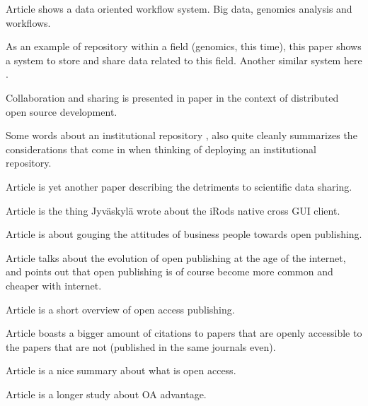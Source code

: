 Article \cite{DBLP:conf/bcb/PiredduLSZ14} shows a data oriented workflow
system. Big data, genomics analysis and workflows.

As an example of repository within a field (genomics, this time), this paper
\cite{craigon2004nascarrays} shows a system to store and share data related
to this field. Another similar system here \cite{DBLP:journals/nar/EdgarDL03}.

Collaboration and sharing is presented in paper \cite{craigon2004nascarrays} in
the context of distributed open source development.

Some words about an institutional repository \cite{gibbons2009benefits}, also
quite cleanly summarizes the considerations that come in when thinking of
deploying an institutional repository.

Article \cite{DBLP:conf/icegov/SayogoP11} is yet another paper describing
the detriments to scientific data sharing.

Article \cite{irodsinproceedings} is the thing Jyväskylä wrote about the iRods
native cross GUI client.

Article \cite{DBLP:conf/elpub/Hedlund08} is about gouging the attitudes of
business people towards open publishing.

Article \cite{laakso2011development} talks about the evolution of open
publishing at the age of the internet, and points out that open publishing
is of course become more common and cheaper with internet.

Article \cite{suber2007open} is a short overview of open access publishing.

Article \cite{harnad2004comparing} boasts a bigger amount of citations to
papers that are openly accessible to the papers that are not (published in the
same journals even).

Article \cite{bailey2008open} is a nice summary about what is open access.

Article \cite{DBLP:journals/corr/abs-cs-0606079} is a longer study about OA
advantage.

\fi
